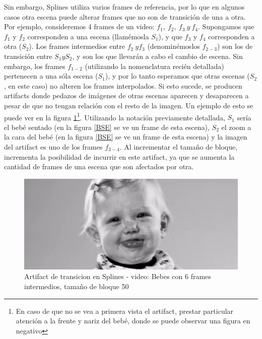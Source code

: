 \par Sin embargo, Splines utiliza varios frames de referencia, por lo que en algunos casos otra escena puede alterar frames que no son de transici\'on de una a otra.
Por ejemplo, consideremos 4 frames de un video: $f_1,\ f_2,\ f_3\ y\ f_4$.
Supongamos que $f_1$ y $f_2$ corresponden a una escena (llam\'emosla $S_1$), y que $f_3$ y $f_4$ corresponden a otra ($S_2$).
Los frames intermedios entre $f_2\ y f_3$ (denomin\'emoslos $f_{2-3}$) son los de transici\'on entre $S_1 y S_2$, y son los que llevar\'an a cabo el cambio de escena.
Sin embargo, los frames $f_{1-2}$ (utilizando la nomenclatura reci\'en detallada) pertenecen a una s\'ola escena ($S_1$), y por lo tanto esperamos que otras escenas ($S_2$, en este caso) no alteren los frames interpolados.
Si esto sucede, se producen artifacts donde pedazos de im\'agenes de otras escenas aparecen y desaparecen a pesar de que no tengan relaci\'on con el resto de la imagen.
Un ejemplo de esto se puede ver en la figura \ref{BebesSplinesArtifact}\footnote{En caso de que no se vea a primera vista el artifact, prestar particular atenci\'on a la frente y nariz del beb\'e, donde se puede observar una figura en negativo}.
Utilizando la notaci\'on previamente detallada, $S_1$ ser\'ia el beb\'e sentado (en la figura \ref{BSE} se ve un frame de esta escena), $S_2$ el zoom a la cara del beb\'e (en la figura \ref{BSE} se ve un frame de esta escena) y la imagen del artifact es uno de los frames $f_{3-4}$.
Al incrementar el tama\~no de bloque, incrementa la posibilidad de incurrir en este artifact, ya que se aumenta la cantidad de frames de una escena que son afectados por otra.

\FloatBarrier
\begin{figure}[h]
\begin{center}
\caption{Artifact de transicion en Splines - video: Bebes con 6 frames intermedios, tama\~no de bloque 50}
\label{BebesSplinesArtifact}
\includegraphics[width=0.9\columnwidth]{imagenes/cualitativos/BSA.png}
\end{center}
\end{figure}

